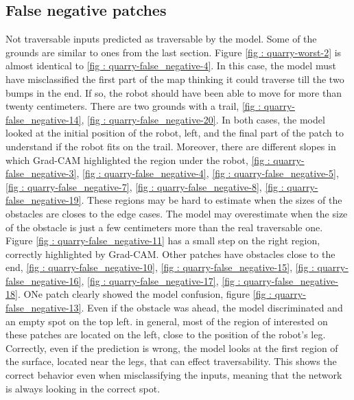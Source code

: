 \subsection{False negative patches}
Not traversable inputs predicted as traversable by the model. Some of the grounds are similar to ones from the last section. Figure \ref{fig : quarry-worst-2} is almost identical to \ref{fig : quarry-false_negative-4}. In this case, the model must have misclassified the first part of the map thinking it could traverse till the two bumps in the end. If so, the robot should have been able to move for more than twenty centimeters. There are two grounds with a trail, \ref{fig : quarry-false_negative-14}, \ref{fig : quarry-false_negative-20}. In both cases, the model looked at the initial position of the robot, left, and the final part of the patch to understand if the robot fits on the trail. Moreover, there are different slopes in which Grad-CAM highlighted the region under the robot,  \ref{fig : quarry-false_negative-3},  \ref{fig : quarry-false_negative-4},  \ref{fig : quarry-false_negative-5},  \ref{fig : quarry-false_negative-7},  \ref{fig : quarry-false_negative-8},  \ref{fig : quarry-false_negative-19}. These regions may be hard to estimate when the sizes of the obstacles are closes to the edge cases. The model may overestimate when the size of the obstacle is just a few centimeters more than the real traversable one. Figure \ref{fig : quarry-false_negative-11} has a small step on the right region, correctly highlighted by Grad-CAM. Other patches have obstacles close to the end, \ref{fig : quarry-false_negative-10}, \ref{fig : quarry-false_negative-15}, \ref{fig : quarry-false_negative-16}, \ref{fig : quarry-false_negative-17}, \ref{fig : quarry-false_negative-18}. ONe patch clearly showed the model confusion, figure \ref{fig : quarry-false_negative-13}. Even if the obstacle was ahead, the model discriminated and an empty spot on the top left. 
in general, most of the region of interested on these patches are located on the left, close to the position of the robot's leg. Correctly, even if the prediction is wrong, the model looks at the first region of the surface, located near the legs, that can effect traversability. This shows the correct behavior even when misclassifying the inputs, meaning that the network is always looking in the correct spot. 
